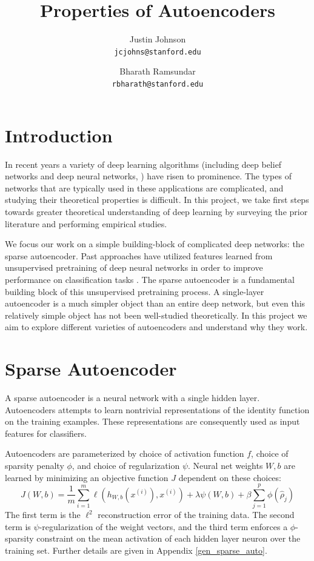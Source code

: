 \documentclass[twocolumn]{article}
\title{Properties of Autoencoders}
\author{%
    Justin Johnson \\
    \texttt{jcjohns@stanford.edu}
  \and
    Bharath Ramsundar \\
    \texttt{rbharath@stanford.edu}
}
\date{}
\newcommand{\xii}{x^{(i)}}
\begin{document}
\maketitle

\section{Introduction}
In recent years a variety of deep learning algorithms (including deep belief
networks \cite{hinton2006fast,lee2009convolutional} and deep neural networks,
\cite{krizhevsky2012imagenet,le2011building}) have risen to prominence.
The types of networks that are typically used in these applications are 
complicated, and studying their theoretical properties is difficult. In this
project, we take first steps towards greater theoretical understanding of
deep learning by surveying the prior literature and performing empirical
studies.

We focus our work on a simple building-block of complicated deep networks: the
sparse autoencoder. Past approaches have utilized features learned from
unsupervised pretraining of deep neural networks in order to improve performance
on classification tasks \cite{le2011building}. The sparse autoencoder is a
fundamental building block of this unsupervised pretraining process. A
single-layer autoencoder is a much simpler object than an entire deep network,
but even this relatively simple object has not been well-studied theoretically.
In this project we aim to explore different varieties of autoencoders and
understand why they work.

\section{Sparse Autoencoder} A sparse autoencoder is a neural network with a
single hidden layer. Autoencoders attempts to learn nontrivial representations
of the identity function on the training examples. These representations are
consequently used as input features for classifiers. 

Autoencoders are parameterized by choice of activation function $f$, choice of
sparsity penalty $\phi$, and choice of regularization $\psi$.  Neural net weights $W,b$
are learned by minimizing an objective function $J$ dependent on these choices:
\[J(W,b)=\frac1m\sum_{i=1}^m\ell(h_{W,b}(\xii),\xii)+\lambda\psi(W,b)+\beta\sum_{j=1}^p\phi(\hat\rho_j)\]
The first term is the $\ell^2$ reconstruction error of the training
data. The second term is $\psi$-regularization of the weight vectors, and the
third term enforces a $\phi$-sparsity constraint on the mean activation of each hidden layer neuron over the training set. Further details are given in Appendix
\ref{gen_sparse_auto}.
\end{document}
